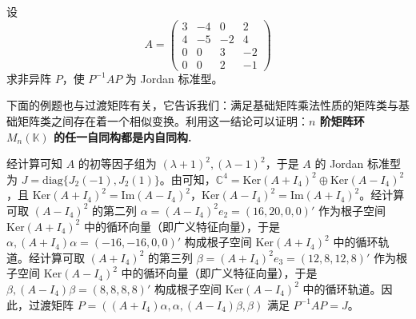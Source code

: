 \documentclass[../../main.tex]{subfiles}%
\begin{document}
\begin{example}
设
\[
A = \begin{pmatrix}
3 & -4 & 0 & 2 \\
4 & -5 & -2 & 4 \\
0 & 0 & 3 & -2 \\
0 & 0 & 2 & -1
\end{pmatrix}
\]
求非异阵 $P$，使 $P^{-1}AP$ 为 Jordan 标准型。
\end{example}
\begin{remark}
下面的例题也与过渡矩阵有关，它告诉我们：满足基础矩阵乘法性质的矩阵类与基础矩阵类之间存在着一个相似变换。利用这一结论可以证明：\textbf{$n$ 阶矩阵环 $M_n(\mathbb{K})$ 的任一自同构都是内自同构.}
\end{remark}
\begin{solution}

经计算可知 $A$ 的初等因子组为 $(\lambda + 1)^2,(\lambda - 1)^2$，于是 $A$ 的 Jordan 标准型为 $J = \mathrm{diag}\{J_2(-1),J_2(1)\}$。由可知，$\mathbb{C}^4 = \mathrm{Ker}(A + I_4)^2 \oplus \mathrm{Ker}(A - I_4)^2$，且 $\mathrm{Ker}(A + I_4)^2 = \mathrm{Im}(A - I_4)^2$，$\mathrm{Ker}(A - I_4)^2 = \mathrm{Im}(A + I_4)^2$。经计算可取 $(A - I_4)^2$ 的第二列 $\alpha = (A - I_4)^2e_2 = (16,20,0,0)'$ 作为根子空间 $\mathrm{Ker}(A + I_4)^2$ 中的循环向量（即广义特征向量），于是 $\alpha,(A + I_4)\alpha = (-16,-16,0,0)'$ 构成根子空间 $\mathrm{Ker}(A + I_4)^2$ 中的循环轨道。经计算可取 $(A + I_4)^2$ 的第三列 $\beta = (A + I_4)^2e_3 = (12,8,12,8)'$ 作为根子空间 $\mathrm{Ker}(A - I_4)^2$ 中的循环向量（即广义特征向量），于是 $\beta,(A - I_4)\beta = (8,8,8,8)'$ 构成根子空间 $\mathrm{Ker}(A - I_4)^2$ 中的循环轨道。因此，过渡矩阵 $P = ((A + I_4)\alpha,\alpha,(A - I_4)\beta,\beta)$ 满足 $P^{-1}AP = J$。

\end{solution}
\end{document}

